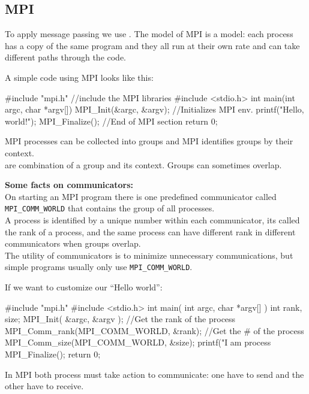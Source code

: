 \subsection{MPI}
    \begin{tcolorbox}[vert]
        To apply message passing we use . The model of MPI is a  model: each process has a copy of the same program and they all run at their own rate and can take different paths through the code.
    \end{tcolorbox}
    A simple code using MPI looks like this:
    \begin{codeCenter}
    \begin{Ccode}
#include "mpi.h" //include the MPI libraries
#include <stdio.h>
int main(int argc, char *argv[])
{
    MPI_Init(&argc, &argv); //Initializes MPI env.
    printf("Hello, world!\n");
    MPI_Finalize(); //End of MPI section
    return 0;
}
    \end{Ccode}
    \end{codeCenter}
    \begin{tcolorbox}[vert]
       MPI processes can be collected into groups and MPI identifies groups by their context.\\
        are combination of a group and its context. Groups can sometimes overlap.
    \end{tcolorbox}
    \begin{tcolorbox}[gris]
        \textbf{Some facts on communicators:}\\
        On starting an MPI program there is one predefined communicator called \lstinline!MPI_COMM_WORLD! that contains the group of all processes.\\
        A process is identified by a unique number within each communicator, its called the rank of a process, and the same process can have different rank in different communicators when groups overlap.\\
        The utility of communicators is to minimize unnecessary communications, but simple programs usually only use \lstinline!MPI_COMM_WORLD!.
    \end{tcolorbox}
    If we want to customize our ``Hello world'':
    \begin{codeCenter}
    \begin{Ccode}
#include "mpi.h"
#include <stdio.h>
int main( int argc, char *argv[] )
{
    int rank, size;
    MPI_Init( &argc, &argv );
    //Get the rank of the process
    MPI_Comm_rank(MPI_COMM_WORLD, &rank); 
    //Get the # of the process
    MPI_Comm_size(MPI_COMM_WORLD, &size); 
    printf("I am process %
    MPI_Finalize();
    return 0;
}
    \end{Ccode}
    \end{codeCenter}
    In MPI both process must take action to communicate: one have to send and the other have to receive.

